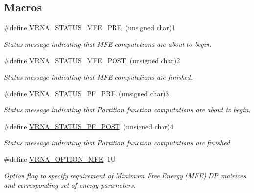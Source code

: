 \subsection*{Macros}
\begin{DoxyCompactItemize}
\item 
\#define \hyperlink{group__fold__compound_ga1a5053dc8acbb0111e852988726f07d6}{V\+R\+N\+A\+\_\+\+S\+T\+A\+T\+U\+S\+\_\+\+M\+F\+E\+\_\+\+P\+R\+E}~(unsigned char)1
\begin{DoxyCompactList}\small\item\em Status message indicating that M\+F\+E computations are about to begin. \end{DoxyCompactList}\item 
\#define \hyperlink{group__fold__compound_ga47c900ca76e56e59e2e83a06e0bde641}{V\+R\+N\+A\+\_\+\+S\+T\+A\+T\+U\+S\+\_\+\+M\+F\+E\+\_\+\+P\+O\+S\+T}~(unsigned char)2
\begin{DoxyCompactList}\small\item\em Status message indicating that M\+F\+E computations are finished. \end{DoxyCompactList}\item 
\#define \hyperlink{group__fold__compound_ga91795d35ebdb6f32be50459f24b3d114}{V\+R\+N\+A\+\_\+\+S\+T\+A\+T\+U\+S\+\_\+\+P\+F\+\_\+\+P\+R\+E}~(unsigned char)3
\begin{DoxyCompactList}\small\item\em Status message indicating that Partition function computations are about to begin. \end{DoxyCompactList}\item 
\#define \hyperlink{group__fold__compound_ga1c6fa243533fd026e50f7d595eaaa565}{V\+R\+N\+A\+\_\+\+S\+T\+A\+T\+U\+S\+\_\+\+P\+F\+\_\+\+P\+O\+S\+T}~(unsigned char)4
\begin{DoxyCompactList}\small\item\em Status message indicating that Partition function computations are finished. \end{DoxyCompactList}\item 
\#define \hyperlink{group__fold__compound_gae63be9127fe7dcc1f9bb14f5bb1064ee}{V\+R\+N\+A\+\_\+\+O\+P\+T\+I\+O\+N\+\_\+\+M\+F\+E}~1\+U
\begin{DoxyCompactList}\small\item\em Option flag to specify requirement of Minimum Free Energy (M\+F\+E) D\+P matrices and corresponding set of energy parameters. \end{DoxyCompactList}\item 

\end{DoxyCompactItemize}
